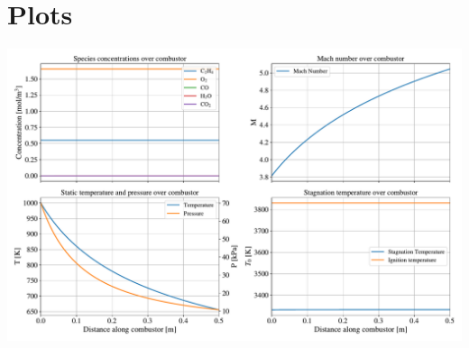 \documentclass[a4paper]{article}
\begin{document}
\newpage
\appendix
\section{Plots}\label{app:other_plots}
\begin{widefigure}[20mm]
    \centering
    \includegraphics[width=\linewidth]{part_2_img/subfig_1000.pdf}
    \caption{Properties over combustion at \SI{1000}{\K}}
    \label{fig:properties_1000}
\end{widefigure}
\end{document}
